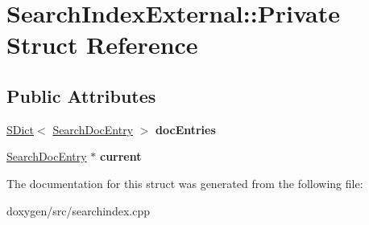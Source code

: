 \hypertarget{struct_search_index_external_1_1_private}{}\section{Search\+Index\+External\+::Private Struct Reference}
\label{struct_search_index_external_1_1_private}
\subsection*{Public Attributes}
\begin{DoxyCompactItemize}
\item 
\mbox{\label{struct_search_index_external_1_1_private_aa5acedd8da9b0370dca75ad18023b0bf}} 
\mbox{\hyperlink{class_s_dict}{S\+Dict}}$<$ \mbox{\hyperlink{struct_search_doc_entry}{Search\+Doc\+Entry}} $>$ {\bfseries doc\+Entries}
\item 
\mbox{\label{struct_search_index_external_1_1_private_a4330b567c9b74836071fc03a43ccd053}} 
\mbox{\hyperlink{struct_search_doc_entry}{Search\+Doc\+Entry}} $\ast$ {\bfseries current}
\end{DoxyCompactItemize}


The documentation for this struct was generated from the following file\+:\begin{DoxyCompactItemize}
\item 
doxygen/src/searchindex.\+cpp\end{DoxyCompactItemize}

